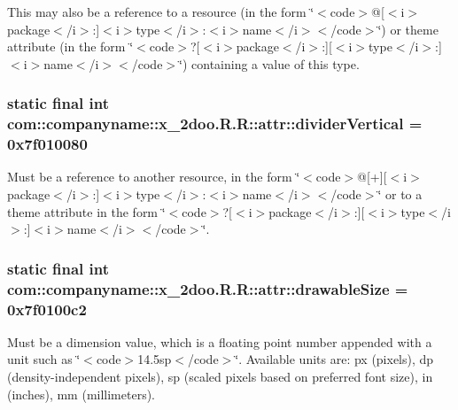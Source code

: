 This may also be a reference to a resource (in the form \char`\"{}$<$code$>$@\mbox{[}$<$i$>$package$<$/i$>$:\mbox{]}$<$i$>$type$<$/i$>$:$<$i$>$name$<$/i$>$$<$/code$>$\char`\"{}) or theme attribute (in the form \char`\"{}$<$code$>$?\mbox{[}$<$i$>$package$<$/i$>$:\mbox{]}\mbox{[}$<$i$>$type$<$/i$>$:\mbox{]}$<$i$>$name$<$/i$>$$<$/code$>$\char`\"{}) containing a value of this type. \hypertarget{classcom_1_1companyname_1_1x__2doo_1_1_r_1_1attr_06c17383ffb44b4e812f6d4f186c37af}{
\subsubsection[{dividerVertical}]{\setlength{\rightskip}{0pt plus 5cm}static final int com::companyname::x\_\-2doo.R.R::attr::dividerVertical = 0x7f010080}}
\label{classcom_1_1companyname_1_1x__2doo_1_1_r_1_1attr_06c17383ffb44b4e812f6d4f186c37af}


Must be a reference to another resource, in the form \char`\"{}$<$code$>$@\mbox{[}+\mbox{]}\mbox{[}$<$i$>$package$<$/i$>$:\mbox{]}$<$i$>$type$<$/i$>$:$<$i$>$name$<$/i$>$$<$/code$>$\char`\"{} or to a theme attribute in the form \char`\"{}$<$code$>$?\mbox{[}$<$i$>$package$<$/i$>$:\mbox{]}\mbox{[}$<$i$>$type$<$/i$>$:\mbox{]}$<$i$>$name$<$/i$>$$<$/code$>$\char`\"{}. \hypertarget{classcom_1_1companyname_1_1x__2doo_1_1_r_1_1attr_fea0fa003a6eac23288f7e98c0d2f6ee}{
\subsubsection[{drawableSize}]{\setlength{\rightskip}{0pt plus 5cm}static final int com::companyname::x\_\-2doo.R.R::attr::drawableSize = 0x7f0100c2}}
\label{classcom_1_1companyname_1_1x__2doo_1_1_r_1_1attr_fea0fa003a6eac23288f7e98c0d2f6ee}


Must be a dimension value, which is a floating point number appended with a unit such as \char`\"{}$<$code$>$14.5sp$<$/code$>$\char`\"{}. Available units are: px (pixels), dp (density-independent pixels), sp (scaled pixels based on preferred font size), in (inches), mm (millimeters). 


